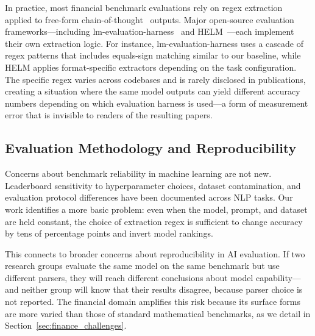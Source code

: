 In practice, most financial benchmark evaluations rely on regex extraction applied to free-form chain-of-thought~\cite{wei2022chain} outputs. Major open-source evaluation frameworks---including lm-evaluation-harness~\cite{gao2024eleuther} and HELM~\cite{liang2023helm}---each implement their own extraction logic. For instance, lm-evaluation-harness uses a cascade of regex patterns that includes equals-sign matching similar to our \numparser{} baseline, while HELM applies format-specific extractors depending on the task configuration. The specific regex varies across codebases and is rarely disclosed in publications, creating a situation where the same model outputs can yield different accuracy numbers depending on which evaluation harness is used---a form of measurement error that is invisible to readers of the resulting papers.

\subsection{Evaluation Methodology and Reproducibility}
\label{sec:reproducibility}

Concerns about benchmark reliability in machine learning are not new. Leaderboard sensitivity to hyperparameter choices, dataset contamination, and evaluation protocol differences have been documented across NLP tasks. Our work identifies a more basic problem: even when the model, prompt, and dataset are held constant, the choice of extraction regex is sufficient to change accuracy by tens of percentage points and invert model rankings.

This connects to broader concerns about reproducibility in AI evaluation. If two research groups evaluate the same model on the same benchmark but use different parsers, they will reach different conclusions about model capability---and neither group will know that their results disagree, because parser choice is not reported. The financial domain amplifies this risk because its surface forms are more varied than those of standard mathematical benchmarks, as we detail in Section~\ref{sec:finance_challenges}.
